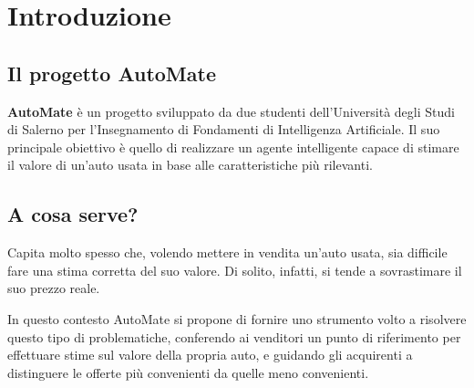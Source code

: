 \chapter{Introduzione}
\section{Il progetto AutoMate}
\textbf{AutoMate} è un progetto sviluppato da due studenti dell'Università degli Studi di Salerno 
per l'Insegnamento di Fondamenti di Intelligenza Artificiale. Il suo principale obiettivo è quello di realizzare 
un agente intelligente capace di stimare il valore di un'auto usata in base alle caratteristiche più rilevanti.
\medskip
\section{A cosa serve?}
Capita molto spesso che, volendo mettere in vendita un'auto usata, sia difficile fare una stima corretta del suo valore. 
Di solito, infatti, si tende a sovrastimare il suo prezzo reale.

In questo contesto AutoMate si propone di fornire uno strumento volto a risolvere questo tipo di problematiche, 
conferendo ai venditori un punto di riferimento per effettuare stime sul valore della propria auto, 
e guidando gli acquirenti a distinguere le offerte più convenienti da quelle meno convenienti.

